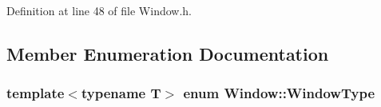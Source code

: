 Definition at line 48 of file Window.\+h.



\subsection{Member Enumeration Documentation}
\subsubsection[{\texorpdfstring{Window\+Type}{WindowType}}]{\setlength{\rightskip}{0pt plus 5cm}template$<$typename T$>$ enum {\bf Window\+::\+Window\+Type}}\hypertarget{class_window_af334e9ffc511fb6b24db90a1a5c56007}{}\label{class_window_af334e9ffc511fb6b24db90a1a5c56007}
